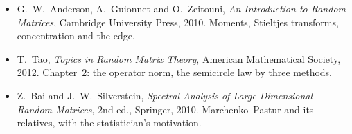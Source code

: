 \begin{itemize}
of local eigenvalue statistics'', \emph{Acta Mathematica} 206 (2011), 127--204 (both first circulated in 2009--2010). The Nobel Prize in Physics 1963, citation for E.~P.~Wigner, nobelprize.org.
\item G.~W.~Anderson, A.~Guionnet and O.~Zeitouni, \emph{An Introduction to Random Matrices}, Cambridge University Press, 2010. Moments, Stieltjes transforms, concentration and the edge.
\item T.~Tao, \emph{Topics in Random Matrix Theory}, American Mathematical Society, 2012. Chapter~2: the operator norm, the semicircle law by three methods.
\item Z.~Bai and J.~W.~Silverstein, \emph{Spectral Analysis of Large Dimensional Random Matrices}, 2nd ed., Springer, 2010. Marchenko--Pastur and its relatives, with the statistician's motivation.
\end{itemize}
